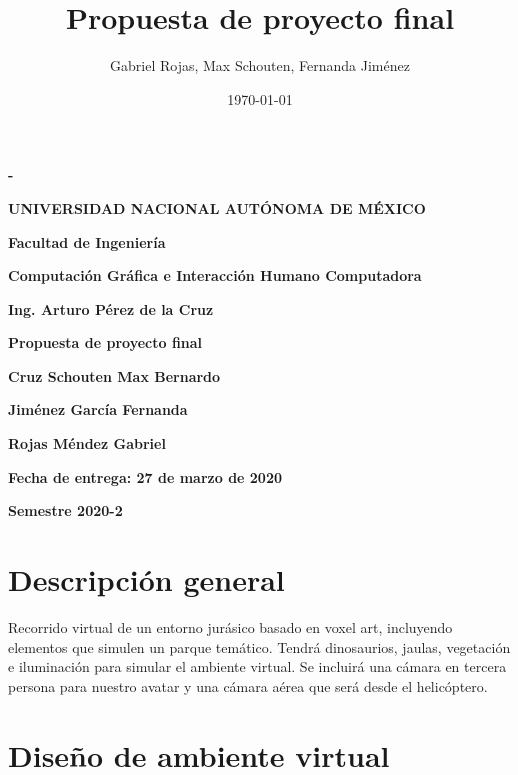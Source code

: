 \documentclass[12pt]{article} %
\title{Propuesta de proyecto final}
\author{Gabriel Rojas, Max Schouten, Fernanda Jiménez}
\date{\today}
\begin{document}
	\begin{titlepage}
		\thispagestyle{fancy}
		\centering
		{\bfseries - \par}
		\vspace{1cm}
		{\bfseries\LARGE UNIVERSIDAD NACIONAL AUTÓNOMA DE MÉXICO \par}
		\vspace{1cm}
		{\bfseries\LARGE Facultad de Ingeniería \par}
		\vspace{1cm}
		{\bfseries\LARGE Computación Gráfica e Interacción Humano Computadora \par}
		\vspace{1cm}
		{\bfseries\LARGE Ing. Arturo Pérez de la Cruz \par}
		\vspace{1cm}
		{\bfseries\LARGE Propuesta de proyecto final \par}
		\vspace{1cm}
		{\bfseries\LARGE Cruz Schouten Max Bernardo \par}
		{\bfseries\LARGE Jiménez García Fernanda \par}
		{\bfseries\LARGE Rojas Méndez Gabriel \par}
		\vspace{1cm}
		{\bfseries\LARGE Fecha de entrega: 27 de marzo de 2020 \par}
		\vspace{1cm}
		{\bfseries\LARGE Semestre 2020-2 \par}
	\end{titlepage}
	
	
	\newpage
	
	\section{Descripción general}
	
	\setlength{\parindent}{1.0cm}
	Recorrido virtual de un entorno jurásico basado en voxel art, incluyendo elementos que simulen un parque temático. 
	Tendrá dinosaurios, jaulas, vegetación e iluminación para simular el ambiente virtual. 
	Se incluirá una cámara en tercera persona para nuestro avatar y una cámara aérea que será desde el helicóptero.
	\setlength{\parindent}{0.0cm}
	
	\section{Diseño de ambiente virtual}
	
\end{document}
